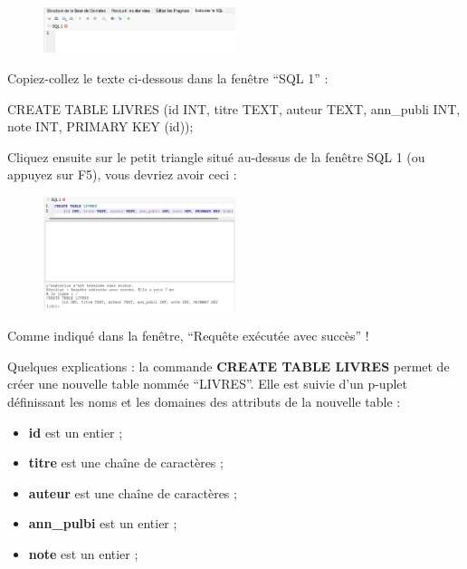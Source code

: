 \documentclass[
  letterpaper,
  DIV=11,
  numbers=noendperiod]{scrartcl}
\newenvironment{Shaded}{\begin{snugshade}}{\end{snugshade}}
\newcommand{\DataTypeTok}[1]{\textcolor[rgb]{0.68,0.00,0.00}{#1}}
\newcommand{\KeywordTok}[1]{\textcolor[rgb]{0.00,0.23,0.31}{#1}}
\newcommand{\NormalTok}[1]{\textcolor[rgb]{0.00,0.23,0.31}{#1}}
\providecommand{\tightlist}{%
  \setlength{\itemsep}{0pt}\setlength{\parskip}{0pt}}\usepackage{longtable,booktabs,array}
\begin{document}
\begin{enumerate}
\begin{figure}
  {\centering \includegraphics[width=0.5\textwidth,height=\textheight]{TP1_3.png}

  }

  \end{figure}

  Copiez-collez le texte ci-dessous dans la fenêtre ``SQL 1'' :

\begin{Shaded}
\begin{Highlighting}[]
\KeywordTok{CREATE} \KeywordTok{TABLE}\NormalTok{ LIVRES}
\NormalTok{    (}\KeywordTok{id} \DataTypeTok{INT}\NormalTok{, titre TEXT, auteur TEXT, ann\_publi }\DataTypeTok{INT}\NormalTok{, note }\DataTypeTok{INT}\NormalTok{, }\KeywordTok{PRIMARY} \KeywordTok{KEY}\NormalTok{ (}\KeywordTok{id}\NormalTok{));}
\end{Highlighting}
\end{Shaded}

  Cliquez ensuite sur le petit triangle situé au-dessus de la fenêtre
  SQL 1 (ou appuyez sur F5), vous devriez avoir ceci :

  \begin{figure}

  {\centering \includegraphics[width=0.5\textwidth,height=\textheight]{TP1_4.png}

  }

  \end{figure}

  Comme indiqué dans la fenêtre, ``Requête exécutée avec succès'' !

  Quelques explications : la commande \textbf{CREATE TABLE LIVRES}
  permet de créer une nouvelle table nommée ``LIVRES''. Elle est suivie
  d'un p-uplet définissant les noms et les domaines des attributs de la
  nouvelle table :

  \begin{itemize}
  \tightlist
  \item
    \textbf{id} est un entier ;
  \item
    \textbf{titre} est une chaîne de caractères ;
  \item
    \textbf{auteur} est une chaîne de caractères ;
  \item
    \textbf{ann\_pulbi} est un entier ;
  \item
    \textbf{note} est un entier ;
  \end{itemize}


\end{enumerate}
\end{document}
